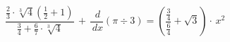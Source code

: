 \documentclass[11pt,a4paper]{article}
\begin{document}
\begin{frame}

\begin{LARGE}





\[\frac{\frac{2}{3}\cdot\sqrt[3]{4} \left(\frac{1}{2}+1 \right)}{\frac{3}{4}+ \frac{6}{7}\cdot\sqrt[3]{4}}\,+\, \frac{\,d}{\,dx}(\pi\div 3)=\left (\frac{\frac{3}{4}}{\frac{6}{4}}+\sqrt{3}\right)\cdot \, x^2\]

\end{LARGE}

\end{frame}
\end{document}
